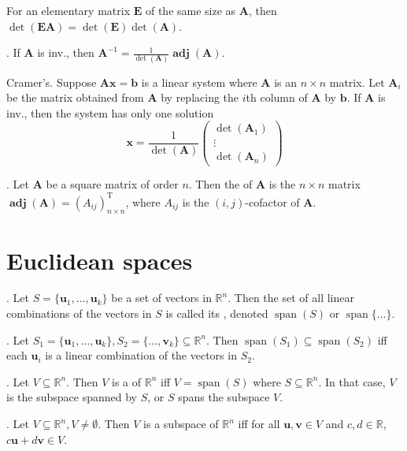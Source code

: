 \documentclass{slnotes}
\DeclareMathOperator*{\adj}{\mathbf{adj}}
\DeclareMathOperator*{\laspan}{span}
\newcommand*{\TT}{\mathrm{T}}
\begin{document}
For an elementary matrix \(\mathbf E\) of the same size as \(\mathbf A\), then \(\det(\mathbf{EA}) = \det(\mathbf E)\det(\mathbf A)\).

. If \(\mathbf A\) is inv., then \(\mathbf A^{-1} = \frac{1}{\det(\mathbf A)}\adj(\mathbf A)\).

 Cramer's. Suppose \(\mathbf{Ax} = \mathbf b\) is a linear system where \(\mathbf A\) is an \(n \times n\) matrix. Let \(\mathbf{A}_i\) be the matrix obtained from \(\mathbf A\) by replacing the \(i\)th column of \(\mathbf A\) by \(\mathbf b\). If \(\mathbf A\) is inv., then the system has only one solution\[\mathbf{x} = \frac{1}{\det(\mathbf A)}\begin{pmatrix}\det(\mathbf A_1)\\\vdots\\\det(\mathbf A_n)\end{pmatrix}\]

. Let \(\mathbf A\) be a square matrix of order \(n\). Then the  of \(\mathbf A\) is the \(n \times n\) matrix \(\adj(\mathbf A) = (A_{ij})^\TT_{n \times n}\), where \(A_{ij}\) is the \((i, j)\)-cofactor of \(\mathbf A\).

\chapter{Euclidean spaces}
. Let \(S = \{\mathbf{u}_1, \hdots, \mathbf{u}_k\}\) be a set of vectors in \(\mathbb{R}^n\). Then the set of all linear combinations of the vectors in \(S\) is called its , denoted \(\laspan(S)\) or \(\laspan\{\hdots\}\).

. Let \(S_1 = \{\mathbf{u}_1, \hdots, \mathbf{u}_k\}, S_2 = \{\hdots, \mathbf{v}_k\} \subseteq \mathbb{R}^n\). Then \(\laspan(S_1) \subseteq \laspan(S_2)\) iff each \(\mathbf{u}_i\) is a linear combination of the vectors in \(S_2\).

. Let \(V \subseteq \mathbb{R}^n\). Then \(V\) is a  of \(\mathbb{R}^n\) iff \(V = \laspan(S)\) where \(S \subseteq \mathbb{R}^n\). In that case, \(V\) is the subspace spanned by \(S\), or \(S\) spans the subspace \(V\).

. Let \(V \subseteq \mathbb{R}^n, V \neq \emptyset\). Then \(V\) is a subspace of \(\mathbb{R}^n\) iff for all \(\mathbf{u}, \mathbf{v} \in V\) and \(c, d \in \mathbb{R}\), \(c\mathbf{u} + d\mathbf{v} \in V\).
\end{document}
